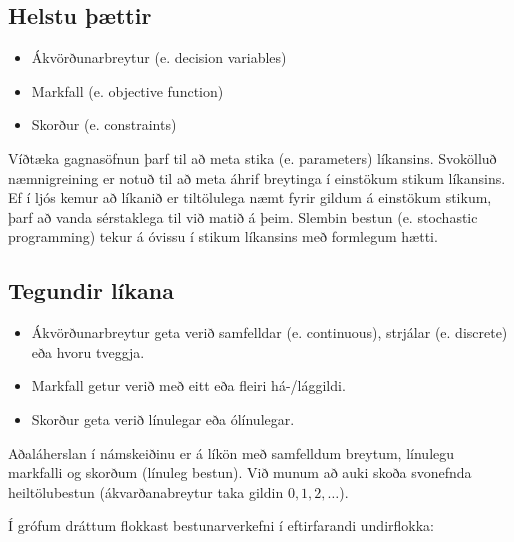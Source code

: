 \subsection{Helstu þættir}
\begin{itemize} 
\item Ákvörðunarbreytur (e. decision variables)  
\item Markfall (e. objective function)  
\item Skorður (e. constraints)  
\end{itemize} 

Víðtæka gagnasöfnun þarf til að meta stika (e. parameters) líkansins. 
Svokölluð næmnigreining er notuð til að meta áhrif breytinga í einstökum stikum líkansins. Ef í ljós kemur að líkanið er tiltölulega næmt fyrir gildum á einstökum stikum, þarf að vanda sérstaklega til við matið á þeim.
Slembin bestun (e. stochastic programming) tekur á óvissu í stikum líkansins með formlegum hætti.

\subsection{Tegundir líkana}
\begin{itemize}
 \item Ákvörðunarbreytur geta verið samfelldar (e. continuous), strjálar (e. discrete) eða hvoru tveggja.
 \item Markfall getur verið með eitt eða fleiri há-/lággildi.
 \item Skorður geta verið línulegar eða ólínulegar.
\end{itemize}

Aðaláherslan í námskeiðinu er á líkön með samfelldum breytum, línulegu markfalli og skorðum (línuleg bestun). Við munum að auki skoða svonefnda heiltölubestun (ákvarðanabreytur taka gildin $0,1,2,\ldots$).

Í grófum dráttum flokkast bestunarverkefni í eftirfarandi undirflokka:

